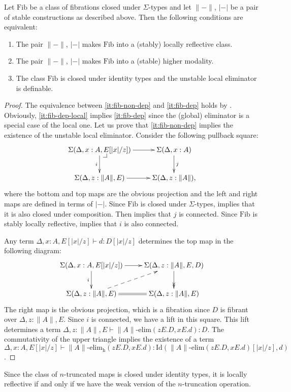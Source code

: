 \documentclass[reqno]{amsart}
\makeatletter
\theoremstyle{definition}
\theoremstyle{remark}
\newcommand{\fs}[1]{\mathrm{#1}}
\newcommand{\Id}{\fs{Id}}
\newcommand{\Fib}{\fs{Fib}}
\numberwithin{figure}{section}
\newcommand{\pb}[1][dr]{\save*!/#1-1.2pc/#1:(-1,1)@^{|-}\restore}
\makeatother
\begin{document}
\begin{prop}
Let $\Fib$ be a class of fibrations closed under $\Sigma$-types and let $\| - \|$, $| - |$ be a pair of stable constructions as described above.
Then the following conditions are equivalent:
\begin{enumerate}
\item \label{it:fib-non-dep} The pair $\| - \|$, $| - |$ makes $\Fib$ into a (stably) locally reflective class.
\item \label{it:fib-dep} The pair $\| - \|$, $| - |$ makes $\Fib$ into a (stable) higher modality.
\item \label{it:fib-dep-local} The class $\Fib$ is closed under identity types and the unstable local eliminator is definable.
\end{enumerate}
\end{prop}
\begin{proof}
The equivalence between \eqref{it:fib-non-dep} and \eqref{it:fib-dep} holds by .
Obviously, \eqref{it:fib-dep-local} implies \eqref{it:fib-dep} since the (global) eliminator is a special case of the local one.
Let us prove that \eqref{it:fib-non-dep} implies the existence of the unstable local eliminator.
Consider the following pullback square:
\[ \xymatrix{ \Sigma(\Delta, x : A, E[|x|/z]) \ar[r] \ar[d]_i \pb   & \Sigma(\Delta, x : A) \ar[d]^j \\
              \Sigma(\Delta, z : \| A \|, E) \ar[r]                 & \Sigma(\Delta, z : \| A \|),
            } \]
where the bottom and top maps are the obvious projection and the left and right maps are defined in terms of $| - |$.
Since $\Fib$ is closed under $\Sigma$-types,  implies that it is also closed under composition.
Then  implies that $j$ is connected.
Since $\Fib$ is stably locally reflective,  implies that $i$ is also connected.

Any term $\Delta, x : A, E[|x|/z] \vdash d : D[|x|/z]$ determines the top map in the following diagram:
\[ \xymatrix{ \Sigma(\Delta, x : A, E[|x|/z]) \ar[r] \ar[d]_i           & \Sigma(\Delta, z : \| A \|, E, D) \ar@{->>}[d] \\
              \Sigma(\Delta, z : \| A \|, E) \ar@{-->}[ur] \ar@{=}[r]   & \Sigma(\Delta, z : \| A \|, E)
            } \]
The right map is the obvious projection, which is a fibration since $D$ is fibrant over $\Delta, z : \| A \|, E$.
Since $i$ is connected, we have a lift in this square.
This lift determines a term $\Delta, z : \| A \|, E \vdash \| A \|\text{-}\fs{elim}(z E. D, x E. d) : D$.
The commutativity of the upper triangle implies the existence of a term $\Delta, x : A, E[|x|/z] \vdash \| A \|\text{-}\fs{elim_h}(z E. D, x E .d) : \Id(\| A \|\text{-}\fs{elim}(z E. D, x E. d)[|x|/z],d)$.
\end{proof}

\begin{example}
Since the class of $n$-truncated maps is closed under identity types, it is locally reflective if and only if we have the weak version of the $n$-truncation operation.
\end{example}



\end{document}
